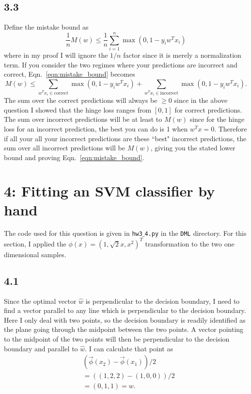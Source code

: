 \documentclass[12pt]{amsart}
\begin{document}
\subsection*{3.3}
Define the mistake bound as
\begin{equation} \label{eqn:mistake_bound}
\frac{1}{n}M(w) \leq \frac{1}{n}\sum_{i = 1}^n \max(0, 1 - y_i w^T x_i)
\end{equation}
where in my proof I will ignore the $1/n$ factor since it is merely a normalization term.  If you consider the two regimes where your predictions are incorrect and correct, Eqn.~\ref{eqn:mistake_bound} becomes
\begin{equation} \label{eqn:mb} 
M(w) \leq \sum_{w^Tx_i \in \text{correct}} \max(0, 1 - y_i w^T x_i) + \sum_{w^Tx_i \in \text{incorrect}} \max(0, 1 - y_i w^T x_i).
\end{equation}
The sum over the correct predictions will always be $\geq 0$ since in the above question I showed that the hinge loss ranges from $[0,1]$ for correct predictions.  The sum over incorrect predictions will be at least to $M(w)$ since for the hinge loss for an incorrect prediction, the best you can do is 1 when $w^Tx = 0$.  Therefore if all your all your incorrect predictions are these ``best" incorrect predictions, the sum over all incorrect predictions will be $M(w)$, giving you the stated lower bound and proving Eqn.~\ref{eqn:mistake_bound}.  

\section*{4: Fitting an SVM classifier by hand}

The code used for this question is given in {\tt hw3$\_$4.py} in the {\tt DML} directory.  For this section, I applied the $\phi(x) = (1, \sqrt{2}x, x^2)^T$ transformation to the two one dimensional samples.

\subsection*{4.1}
Since the optimal vector $\hat{w}$ is perpendicular to the decision boundary, I need to find a vector parallel to any line which is perpendicular to the decision boundary.  Here I only deal with two points, so the decision boundary is readily identified as the plane going through the midpoint between the two points.  A vector pointing to the midpoint of the two points will then be perpendicular to the decision boundary and parallel to $\hat{w}$.  I can calculate that point as 
\begin{equation}
\begin{split}
& (\vec{\phi}(x_2) - \vec{\phi}(x_1))/2 \\
& = ((1,2,2) - (1,0,0))/2 \\
& = (0,1,1) = w.
\end{split}
\end{equation}
\end{document}
